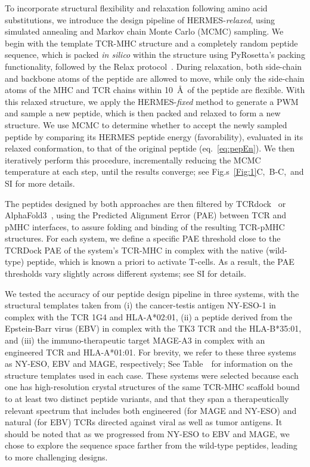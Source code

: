 To incorporate structural flexibility and relaxation following amino acid substitutions, we
introduce the design pipeline of HERMES-{\em relaxed}, using simulated annealing and Markov chain
Monte Carlo (MCMC) sampling. We begin with the template TCR-MHC structure and a completely random
peptide sequence, which is packed {\em in silico} within the structure using PyRosetta's packing
functionality, followed by the Relax protocol~\cite{Chaudhury2010-mo}. During relaxation, both
side-chain and backbone atoms of the peptide are allowed to move, while only the side-chain atoms of
the MHC and TCR chains within 10~\AA~of the peptide are flexible. With this relaxed structure, we
apply the HERMES-{\em fixed} method to generate a PWM and sample a new peptide, which is then packed
and relaxed to form a new structure. We use MCMC to determine whether to accept the newly sampled
peptide by comparing its HERMES peptide energy (favorability), evaluated in its relaxed
conformation, to that of the original peptide (eq.~\ref{eq:pepEn}). We then iteratively perform this
procedure, incrementally reducing the MCMC temperature at each step, until the results converge; see
Fig.s~\ref{Fig:1}C,~\HermesDesignsEnergiesFigure B-C,~and SI for more details.

The peptides designed by both approaches are then filtered by TCRdock~\cite{Bradley2023-rl} or
{AlphaFold3}~\cite{Abramson2024-jp}, using the Predicted Alignment Error (PAE) between TCR and pMHC
interfaces, to assure folding and binding of the resulting TCR-pMHC structures. For each system, we
define a specific PAE threshold close to the TCRDock PAE of the system's TCR-MHC in complex with the
native (wild-type) peptide, which is known a priori to activate T-cells. As a result, the PAE
thresholds vary slightly across different systems; see SI for details.

We tested the accuracy of our peptide design pipeline in three systems, with the structural
templates taken from (i) the cancer-testis antigen NY-ESO-1 in complex with the TCR 1G4 and
HLA-A*02:01, (ii) a peptide derived from the Epstein-Barr virus (EBV) in complex with the TK3 TCR
and the HLA-B*35:01, and (iii) the immuno-therapeutic target MAGE-A3 in complex with an engineered
TCR and HLA-A*01:01. For brevity, we refer to these three systems as NY-ESO, EBV and MAGE,
respectively; See Table~\DesignInfoTable~for information on the structure templates used in each
case. {These systems were selected because each one has high-resolution crystal structures of the
same TCR-MHC scaffold bound to at least two distinct peptide variants, and that they span a
therapeutically relevant spectrum that includes both engineered (for MAGE and NY-ESO) and natural
(for EBV) TCRs directed against viral as well as tumor antigens.} It should be noted that as we
progressed from NY-ESO to EBV and MAGE, we chose to explore the sequence space farther from the
wild-type peptides, leading to more challenging designs.

